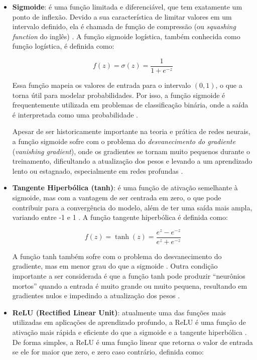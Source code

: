 \begin{itemize}
    \item \textbf{Sigmoide}: é uma função limitada e diferenciável, que tem exatamente um ponto de inflexão. Devido a sua característica de limitar valores em um intervalo definido, ela é chamada de função de compressão (ou \textit{squashing function} do inglês) \citep{lederer2021activation}. A função sigmoide logística, também conhecida como função logística, é definida como:
    
    \[
    f(z) = \sigma(z) = \frac{1}{1 + e^{-z}}
    \]
    
    Essa função mapeia os valores de entrada para o intervalo $(0, 1)$, o que a torna útil para modelar probabilidades. Por isso, a função sigmoide é frequentemente utilizada em problemas de classificação binária, onde a saída é interpretada como uma probabilidade \citep{nwankpa2018activation}.

    Apesar de ser historicamente importante na teoria e prática de redes neurais, a função sigmoide sofre com o problema do \textit{desvanecimento do gradiente} (\textit{vanishing gradient}), onde os gradientes se tornam muito pequenos durante o treinamento, dificultando a atualização dos pesos e levando a um aprendizado lento ou estagnado, especialmente em redes profundas \citep{Dubey2022}.

    \item \textbf{Tangente Hiperbólica (tanh)}: é uma função de ativação semelhante à sigmoide, mas com a vantagem de ser centrada em zero, o que pode contribuir para a convergência do modelo, além de ter uma saída mais ampla, variando entre -1 e 1 \citep{nwankpa2018activation}. A função tangente hiperbólica é definida como:
    
    \[
    f(z) = \tanh(z) = \frac{e^{z} - e^{-z}}{e^{z} + e^{-z}}
    \]
    
    A função tanh também sofre com o problema do desvanecimento do gradiente, mas em menor grau do que a sigmoide \citep{Dubey2022}. Outra condição importante a ser considerada é que a função tanh pode produzir ``neurônios mortos'' quando a entrada é muito grande ou muito pequena, resultando em gradientes nulos e impedindo a atualização dos pesos \citep{nwankpa2018activation}.

    \item \textbf{ReLU (Rectified Linear Unit)}: atualmente uma das funções mais utilizadas em aplicações de aprendizado profundo, a ReLU é uma função de ativação mais rápida e eficiente do que a sigmoide e a tangente hiperbólica \citep{Nair2010}. De forma simples, a ReLU é uma função linear que retorna o valor de entrada se ele for maior que zero, e zero caso contrário, definida como:
    

\end{itemize}
